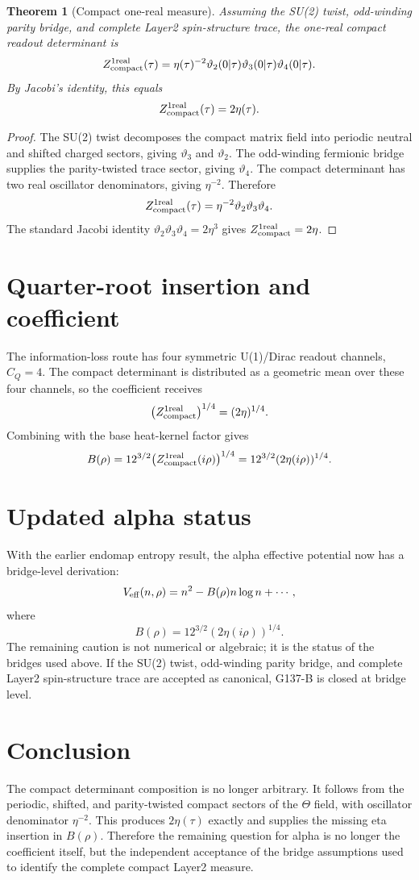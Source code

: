 \documentclass[12pt,a4paper]{article}
\newtheorem{theorem}[definition]{Theorem}
\begin{document}
\begin{theorem}[Compact one-real measure]
Assuming the SU(2) twist, odd-winding parity bridge, and complete Layer2
spin-structure trace, the one-real compact readout determinant is
\[
  Z_{\rm compact}^{1\rm real}(\tau)
  =\eta(\tau)^{-2}\vartheta_2(0|\tau)\vartheta_3(0|\tau)\vartheta_4(0|\tau).
\]
By Jacobi's identity, this equals
\[
  Z_{\rm compact}^{1\rm real}(\tau)=2\eta(\tau).
\]
\end{theorem}

\begin{proof}
The SU(2) twist decomposes the compact matrix field into periodic neutral and
shifted charged sectors, giving $\vartheta_3$ and $\vartheta_2$.  The
odd-winding fermionic bridge supplies the parity-twisted trace sector, giving
$\vartheta_4$.  The compact determinant has two real oscillator denominators,
giving $\eta^{-2}$.  Therefore
\[
  Z_{\rm compact}^{1\rm real}(\tau)
  =\eta^{-2}\vartheta_2\vartheta_3\vartheta_4.
\]
The standard Jacobi identity $\vartheta_2\vartheta_3\vartheta_4=2\eta^3$ gives
$Z_{\rm compact}^{1\rm real}=2\eta$.
\end{proof}

\section{Quarter-root insertion and coefficient}

The information-loss route has four symmetric U(1)/Dirac readout channels,
$C_Q=4$.  The compact determinant is distributed as a geometric mean over these
four channels, so the coefficient receives
\[
  \bigl(Z_{\rm compact}^{1\rm real}\bigr)^{1/4}=(2\eta)^{1/4}.
\]
Combining with the base heat-kernel factor gives
\[
  B(\rho)=12^{3/2}\bigl(Z_{\rm compact}^{1\rm real}(i\rho)\bigr)^{1/4}
  =12^{3/2}(2\eta(i\rho))^{1/4}.
\]

\section{Updated alpha status}

With the earlier endomap entropy result, the alpha effective potential now has
a bridge-level derivation:
\[
  V_{\rm eff}(n,\rho)=n^2-B(\rho)n\log n+\cdots,
\]
where
\[
  B(\rho)=12^{3/2}(2\eta(i\rho))^{1/4}.
\]
The remaining caution is not numerical or algebraic; it is the status of the
bridges used above.  If the SU(2) twist, odd-winding parity bridge, and complete
Layer2 spin-structure trace are accepted as canonical, G137-B is closed at
bridge level.

\section{Conclusion}

The compact determinant composition is no longer arbitrary.  It follows from
the periodic, shifted, and parity-twisted compact sectors of the $\Theta$ field,
with oscillator denominator $\eta^{-2}$.  This produces $2\eta(\tau)$ exactly
and supplies the missing eta insertion in $B(\rho)$.  Therefore the remaining
question for alpha is no longer the coefficient itself, but the independent
acceptance of the bridge assumptions used to identify the complete compact
Layer2 measure.
\end{document}
